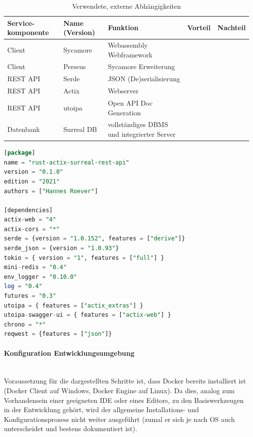 \documentclass[notitlepage, hidelinks]{article}
\begin{document}
\begin{table}[H]
\begin{center}
\begin{tabular}{| L{2cm} | L{2cm} | L{3.2cm} | L{3.2cm} | L{3.2cm} |}
\hline
Service- komponente & Name (Version) & Funktion & Vorteil & Nachteil \\ \hline
Client & Sycamore & Webassembly Webframework & & \\ \hline
Client & Perseus & Sycamore Erweiterung & & \\ \hline
REST API & Serde & JSON (De)serialisierung & & \\ \hline
REST API & Actix & Webserver & & \\ \hline
REST API & utoipa & Open API Doc Generation & & \\ \hline
Datenbank & Surreal DB & vollständiges DBMS und integrierter Server & & \\ \hline 
\end{tabular}
\caption{Verwendete, externe Abhängigkeiten}
\label{tab:dependencies}
\end{center}
\end{table}


\begin{lstlisting}[language=SQL,frame=single,caption=cargo.toml Datei zur Organisation der Abhängigkeiten in Rust,label=toml]
[package]
name = "rust-actix-surreal-rest-api"
version = "0.1.0"
edition = "2021"
authors = ["Hannes Roever"]

[dependencies]
actix-web = "4"
actix-cors = "*"
serde = {version = "1.0.152", features = ["derive"]}
serde_json = {version = "1.0.93"}
tokio = { version = "1", features = ["full"] }
mini-redis = "0.4"
env_logger = "0.10.0"
log = "0.4"
futures = "0.3"
utoipa = { features = ["actix_extras"] }
utoipa-swagger-ui = { features = ["actix-web"] }
chrono = "*"
reqwest = {features = ["json"]}
\end{lstlisting}

\paragraph{Konfiguration Entwicklungsumgebung} \mbox{} \\
Voraussetzung für die dargestellten Schritte ist, dass Docker bereits installiert ist (Docker Client auf Windows, Docker Engine auf Linux). Da dies, analog zum Vorhandensein einer geeigneten IDE oder eines Editors, zu den Basiswerkzeugen in der Entwicklung gehört, wird der allgemeine Installations- und Konfigurationsprozess nicht weiter ausgeführt (zumal er sich je nach OS auch unterscheidet und bestens dokumentiert ist).
\end{document}
